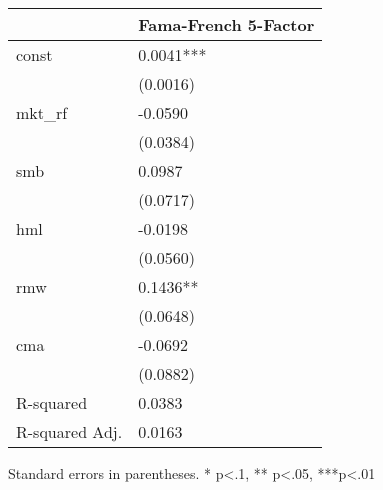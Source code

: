 \begin{table}
\caption{}
\label{}
\begin{center}
\begin{tabular}{ll}
\hline
               & Fama-French 5-Factor  \\
\hline
const          & 0.0041***             \\
               & (0.0016)              \\
mkt\_rf        & -0.0590               \\
               & (0.0384)              \\
smb            & 0.0987                \\
               & (0.0717)              \\
hml            & -0.0198               \\
               & (0.0560)              \\
rmw            & 0.1436**              \\
               & (0.0648)              \\
cma            & -0.0692               \\
               & (0.0882)              \\
R-squared      & 0.0383                \\
R-squared Adj. & 0.0163                \\
\hline
\end{tabular}
\end{center}
\end{table}
\bigskip
Standard errors in parentheses. \newline 
* p<.1, ** p<.05, ***p<.01